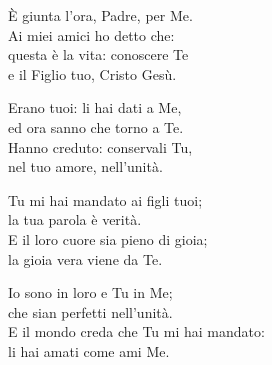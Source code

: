 
\strofa È giunta l'ora, Padre, per Me.\\
Ai miei amici ho detto che:\\
questa è la vita: conoscere Te\\
e il Figlio tuo, Cristo Gesù.

\spazio

\strofa Erano tuoi: li hai dati a Me,\\
ed ora sanno che torno a Te.\\
Hanno creduto: conservali Tu,\\
nel tuo amore, nell'unità.

\spazio

\strofa Tu mi hai mandato ai figli tuoi;\\
la tua parola è verità.\\
E il loro cuore sia pieno di gioia;\\
la gioia vera viene da Te.

\spazio

\strofa Io sono in loro e Tu in Me;\\
che sian perfetti nell'unità.\\
E il mondo creda che Tu mi hai mandato:\\
li hai amati come ami Me.